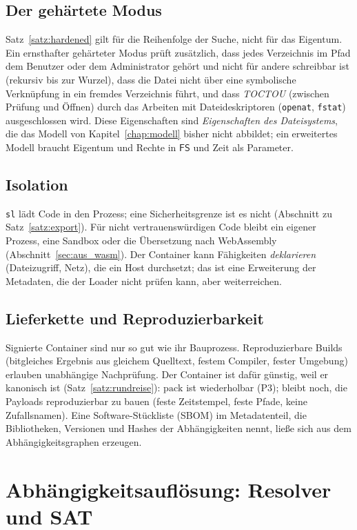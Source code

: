 \documentclass[a4paper,12pt,twoside]{report}
\DeclareRobustCommand{\_}{\ifmmode\mbox{\textunderscore}\else\textunderscore\allowbreak{}\fi}
\theoremstyle{definition}
\newcommand{\FS}{\mathsf{FS}}
\begin{document}
\subsection{Der gehärtete Modus}
Satz~\ref{satz:hardened} gilt für die Reihenfolge der Suche, nicht für das Eigentum. Ein ernsthafter gehärteter Modus prüft zusätzlich, dass jedes Verzeichnis im Pfad dem Benutzer oder dem Administrator gehört und nicht für andere schreibbar ist (rekursiv bis zur Wurzel), dass die Datei nicht über eine symbolische Verknüpfung in ein fremdes Verzeichnis führt, und dass \emph{TOCTOU} (zwischen Prüfung und Öffnen) durch das Arbeiten mit Dateideskriptoren (\texttt{openat}, \texttt{fstat}) ausgeschlossen wird. Diese Eigenschaften sind \emph{Eigenschaften des Dateisystems}, die das Modell von Kapitel~\ref{chap:modell} bisher nicht abbildet; ein erweitertes Modell braucht Eigentum und Rechte in $\FS$ und Zeit als Parameter.

\subsection{Isolation}
\texttt{sl} lädt Code in den Prozess; eine Sicherheitsgrenze ist es nicht (Abschnitt zu Satz~\ref{satz:export}). Für nicht vertrauenswürdigen Code bleibt ein eigener Prozess, eine Sandbox oder die Übersetzung nach WebAssembly (Abschnitt~\ref{sec:aus_wasm}). Der Container kann Fähigkeiten \emph{deklarieren} (Dateizugriff, Netz), die ein Host durchsetzt; das ist eine Erweiterung der Metadaten, die der Loader nicht prüfen kann, aber weiterreichen.

\subsection{Lieferkette und Reproduzierbarkeit}
Signierte Container sind nur so gut wie ihr Bauprozess. Reproduzierbare Builds (bitgleiches Ergebnis aus gleichem Quelltext, festem Compiler, fester Umgebung) erlauben unabhängige Nachprüfung. Der Container ist dafür günstig, weil er kanonisch ist (Satz~\ref{satz:rundreise}): $\mathrm{pack}$ ist wiederholbar (P3); bleibt noch, die Payloads reproduzierbar zu bauen (feste Zeitstempel, feste Pfade, keine Zufallsnamen). Eine Software-Stückliste (SBOM) im Metadatenteil, die Bibliotheken, Versionen und Hashes der Abhängigkeiten nennt, ließe sich aus dem Abhängigkeitsgraphen erzeugen.

\section{Abhängigkeitsauflösung: Resolver und SAT}
\label{sec:aus_resolver}
\end{document}
